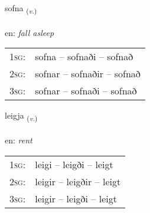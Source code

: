 \documentclass[frontgrid, backgrid]{flacards}\usepackage[]{graphicx}\usepackage[]{xcolor}
\begin{document}
\renewcommand{\flhead}{\vskip5pt \fboxsep=0pt {\small\bfseries\footnotesize Sagnorð | Verb}}
\renewcommand{\fcfoot}{\vskip5pt \fboxsep=0pt \hspace{2pt}{\small\bfseries\footnotesize 3K}}

\renewcommand{\blhead}{\vskip5pt {\small\bfseries\footnotesize Sagnorð | Verb }}
\renewcommand{\bcfoot}{\vskip5pt \hspace{2pt}{\small\bfseries\footnotesize 3K}}


{sofna \small{\textsubscript{(\textit{v.})}} \\[1ex] %
\textphonetic{[sɔpna]} \\
en: \emph{fall asleep} \\  [2ex]
\renewcommand*{\arraystretch}{0.8}
\begin{tabular}{p{1cm}l}
\textsc{1sg}: & sofna -- sofnaði -- sofnað \\ 
\textsc{2sg}: & sofnar -- sofnaðir -- sofnað \\ 
\textsc{3sg}: & sofnar -- sofnaði -- sofnað \\ 
\end{tabular}
}

\renewcommand{\flhead}{\vskip5pt \fboxsep=0pt {\small\bfseries\footnotesize Sagnorð | Verb}}
\renewcommand{\fcfoot}{\vskip5pt \fboxsep=0pt \hspace{2pt}{\small\bfseries\footnotesize 3K}}

\renewcommand{\blhead}{\vskip5pt {\small\bfseries\footnotesize Sagnorð | Verb }}
\renewcommand{\bcfoot}{\vskip5pt \hspace{2pt}{\small\bfseries\footnotesize 3K}}


{leigja \small{\textsubscript{(\textit{v.})}} \\[1ex] %
\textphonetic{[leija]} \\
en: \emph{rent} \\  [2ex]
\renewcommand*{\arraystretch}{0.8}
\begin{tabular}{p{1cm}l}
\textsc{1sg}: & leigi -- leigði -- leigt \\ 
\textsc{2sg}: & leigir -- leigðir -- leigt \\ 
\textsc{3sg}: & leigir -- leigði -- leigt \\ 
\end{tabular}
}
\end{document}

